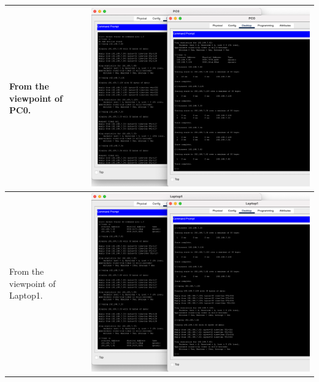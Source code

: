 \documentclass[11pt,a4paper]{report}
\begin{document}
\begin{flushleft}
\begin{center}
\begin{longtable}{ m{5cm} l }
                        From the viewpoint of PC0.                                                                                                                                                                                                                                                                                                                                                                  & \includegraphics[scale=0.34 ,valign=c]{p2-connecting2lanswithrouter/PC0_cmdall}           \\ \hline
                        From the viewpoint of Laptop1.                                                                                                                                                                                                                                                                                                                                                              & \includegraphics[scale=0.34 ,valign=c]{p2-connecting2lanswithrouter/Laptop1_cmdall}       \\ \hline

\end{longtable}
\end{center}
\end{flushleft}
\end{document}
